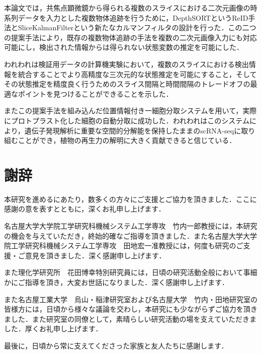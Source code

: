\thispagestyle{fancy2}

本論文では，共焦点顕微鏡から得られる複数のスライスにおける二次元画像の時系列データを入力とした複数物体追跡を行うために，DepthSORTというReID手法とSliceKalmanFilterという新たなカルマンフィルタの設計を行った．この二つの提案手法により，既存の複数物体追跡の手法を複数の二次元画像入力にも対応可能にし，検出された情報からは得られない状態変数の推定を可能にした．

われわれは検証用データの計算機実験において，複数のスライスにおける検出情報を統合することでより高精度な三次元的な状態推定を可能にすること，そしてその状態推定を精度良く行うためのスライス間隔と時間間隔のトレードオフの最適なポイントを見つけることができることを示した．

またこの提案手法を組み込んだ位置情報付き一細胞分取システムを用いて，実際にプロトプラスト化した細胞の自動分取に成功した．われわれはこのシステムにより，遺伝子発現解析に重要な空間的分解能を保持したままのscRNA-seqに取り組むことができ，植物の再生力の解明に大きく貢献できると信じている．

\chapter*{謝辞}

本研究を進めるにあたり，数多くの方々にご支援とご協力を頂きました．ここに感謝の意を表すとともに，深くお礼申し上げます．

名古屋大学大学院工学研究科機械システム工学専攻　竹内一郎教授には，本研究の機会を与えていただき，終始的確なご指導を頂きました．また名古屋大学大学院工学研究科機械システム工学専攻　田地宏一准教授には，何度も研究のご支援・ご意見を頂きました．深く感謝申し上げます．

また理化学研究所　花田博幸特別研究員には，日頃の研究活動全般において事細かにご指導を頂き，大変お世話になりました．深く感謝申し上げます．

また名古屋工業大学　烏山・稲津研究室および名古屋大学　竹内・田地研究室の皆様方には，日頃から様々な議論を交わし，本研究にも少ながらずご協力を頂きました．また研究室の同僚として，素晴らしい研究活動の場を支えていただきました．厚くお礼申し上げます．

最後に，日頃から常に支えてくださった家族と友人たちに感謝します．
